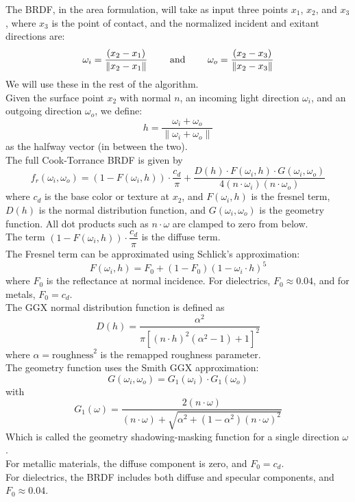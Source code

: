 \documentclass[12pt]{article}
\begin{document}
The BRDF, in the area formulation, will take as input
three points $x_1$, $x_2$, and $x_3$,
where $x_3$ is the point of contact, and
the normalized incident and exitant directions are:
\[ \omega_i = \dfrac{(x_2 - x_1)}{\|x_2 - x_1\|} 
\qquad \text{ and } \qquad 
\omega_o = \dfrac{(x_2 - x_3)}{\|x_2 - x_3\|} \]
We will use these in the rest of the algorithm. \\

Given the surface point $x_2$ with normal $n$, 
an incoming light direction $\omega_i$, 
and an outgoing direction $\omega_o$, 
we define:
\[ h = \frac{\omega_i + \omega_o}
{\|\omega_i + \omega_o\|} \]
as the halfway vector (in between the two). \\

The full Cook-Torrance BRDF is given by
\[f_r(\omega_i, \omega_o) = (1 - F(\omega_i, h)) 
\cdot \frac{c_d}{\pi}
+ \frac{D(h) \cdot F(\omega_i, h) \cdot 
G(\omega_i, \omega_o)}{4 (n \cdot \omega_i)
(n \cdot \omega_o)} \]
where $c_d$ is the base color or texture at $x_2$, 
and $ F(\omega_i, h)$ is the fresnel term, 
$D(h)$ is the normal distribution function, 
and $ G(\omega_i, \omega_o) $ is the geometry function. 
All dot products such as $ n \cdot \omega $ 
are clamped to zero from below. \\

The term $(1 - F(\omega_i, h)) 
\cdot \dfrac{c_d}{\pi}$ is the diffuse term. \\

The Fresnel term can be approximated using 
Schlick's approximation:
\[ F(\omega_i, h) = F_0 + (1 - F_0)
(1 - \omega_i \cdot h)^5 \]
where $F_0$ is the reflectance at normal incidence. 
For dielectrics, $F_0 \approx 0.04$, 
and for metals, $F_0 = c_d$. \\

The GGX normal distribution function is defined as
\[ D(h) = \frac{\alpha^2}{\pi \left[ 
(n \cdot h)^2 (\alpha^2 - 1) + 1 \right]^2} \]
where $\alpha = \text{roughness}^2$ 
is the remapped roughness parameter. \\

The geometry function uses the Smith GGX approximation:
\[ G(\omega_i, \omega_o) = 
G_1(\omega_i) \cdot G_1(\omega_o) \]
with
\[ G_1(\omega) = \frac{2 (n \cdot \omega)}
{(n \cdot \omega) + \sqrt{\alpha^2 + (1 - \alpha^2)
(n \cdot \omega)^2}} \]
Which is called the geometry shadowing-masking 
function for a single direction $\omega$. \\

For metallic materials, 
the diffuse component is zero, and 
$F_0 = c_d$. \\ 
For dielectrics, the BRDF includes both 
diffuse and specular components, 
and $F_0 \approx 0.04$. \\
\end{document}

